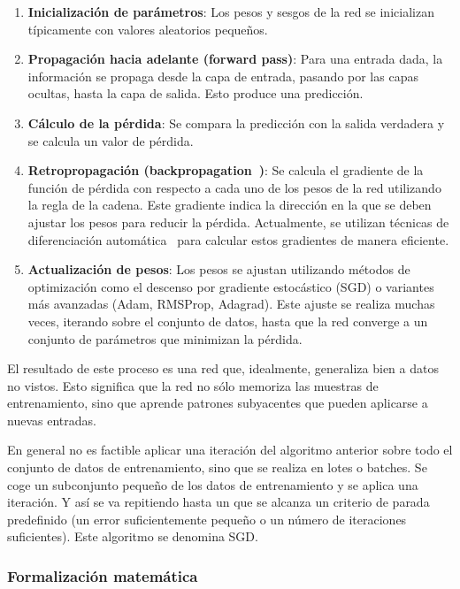 \begin{enumerate}
	\item \textbf{Inicialización de parámetros}: Los pesos y sesgos de la red se inicializan típicamente con valores aleatorios pequeños.
	\item \textbf{Propagación hacia adelante (forward pass)}: Para una entrada dada, la información se propaga desde la capa de entrada, pasando por las capas ocultas, hasta la capa de salida. Esto produce una predicción.
	\item \textbf{Cálculo de la pérdida}: Se compara la predicción con la salida verdadera y se calcula un valor de pérdida.
	\item \textbf{Retropropagación (backpropagation~\citep{backpropagation})}: Se calcula el gradiente de la función de pérdida con respecto a cada uno de los pesos de la red utilizando la regla de la cadena. Este gradiente indica la dirección en la que se deben ajustar los pesos para reducir la pérdida. Actualmente, se utilizan técnicas de diferenciación automática~\citep{Neidinger2010IntroductionTA} para calcular estos gradientes de manera eficiente.
	\item \textbf{Actualización de pesos}: Los pesos se ajustan utilizando métodos de optimización como el descenso por gradiente estocástico (\gls{SGD}) o variantes más avanzadas (\gls{Adam}, RMSProp, Adagrad). Este ajuste se realiza muchas veces, iterando sobre el conjunto de datos, hasta que la red converge a un conjunto de parámetros que minimizan la pérdida.
\end{enumerate}

El resultado de este proceso es una red que, idealmente, generaliza bien a datos no vistos. Esto significa que la red no sólo memoriza las muestras de entrenamiento, sino que aprende patrones subyacentes que pueden aplicarse a nuevas entradas.

En general no es factible aplicar una iteración del algoritmo anterior sobre todo el conjunto de datos de entrenamiento, sino que se realiza en lotes o batches. Se coge un subconjunto pequeño de los datos de entrenamiento y se aplica una iteración. Y así se va repitiendo hasta un que se alcanza un criterio de parada predefinido (un error suficientemente pequeño o un número de iteraciones suficientes). Este algoritmo se denomina \gls{SGD}.

\subsubsection{Formalización matemática}

